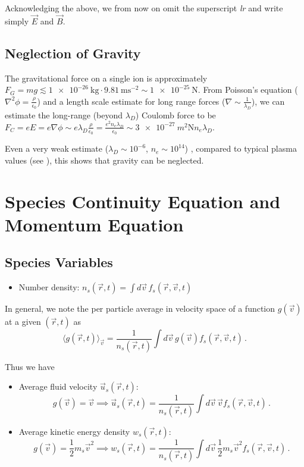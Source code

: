 Acknowledging the above, we from now on omit
the superscript \emph{lr} and write simply $\vec E$ and $\vec B$.

\subsection{Neglection of Gravity}

The gravitational force on a single ion is approximately 
$F_G = m g \lesssim \SI{1e-26}{\kilo\gram} \cdot \SI{9.81}{\meter\second^{-2}} \sim \SI{1e-25}{\newton}$.
From Poisson's equation ($\nabla^2 \phi = \frac{\rho}{\epsilon_0}$) and a length scale
estimate for long range forces ($\nabla \sim \frac{1}{\lambda_D}$), we can estimate the 
long-range (beyond $\lambda_D$) Coulomb force to be $F_C = e E = e \nabla \phi \sim e \lambda_D \frac{\rho}{\epsilon_0} = \frac{e^2 n_e \lambda_D}{\epsilon_0} \sim \SI{3e-27}{m^2 \newton} n_e \lambda_D$.

Even a very weak estimate ($\lambda_D \sim 10^{-6}$, $n_e \sim 10^{14}$) , compared to typical plasma values (see \cite{Blandford2013}), this shows that gravity can be neglected.

\section{Species Continuity Equation and Momentum Equation}
\subsection{Species Variables}
\begin{itemize}
    \item Number density: $n_s(\vec{r}, t) = \int d\vec{v} \, f_s(\vec{r},\vec{v},t)$
\end{itemize}
In general, we note the per particle average in velocity space of a function $g(\vec{v})$ at a given $(\vec{r},t)$ as
\begin{equation*}
    \langle g(\vec{r},t)\rangle_{\vec{v}} = \frac{1}{n_s(\vec{r}, t)} \int d\vec{v} \, g(\vec{v}) f_s(\vec{r},\vec{v},t)  \, .
\end{equation*}

Thus we have 

\begin{itemize}
    \item Average fluid velocity $\vec{u}_s(\vec{r},t)$: 
    \[
    g(\vec{v})=\vec{v} \implies \vec{u}_s(\vec{r},t) =\frac{1}{n_s(\vec{r}, t)} \int d\vec{v} \, \vec{v} f_s(\vec{r},\vec{v},t) \, .
    \]
    \item Average kinetic energy density $w_s(\vec{r},t)$:
    \[
    g(\vec{v})=\frac{1}{2}m_s\vec{v}^2 \implies w_s(\vec{r},t) =\frac{1}{n_s(\vec{r}, t)} \int d\vec{v} \, \frac{1}{2}m_s\vec{v}^2 f_s(\vec{r},\vec{v},t) \, .
    \]
\end{itemize}

